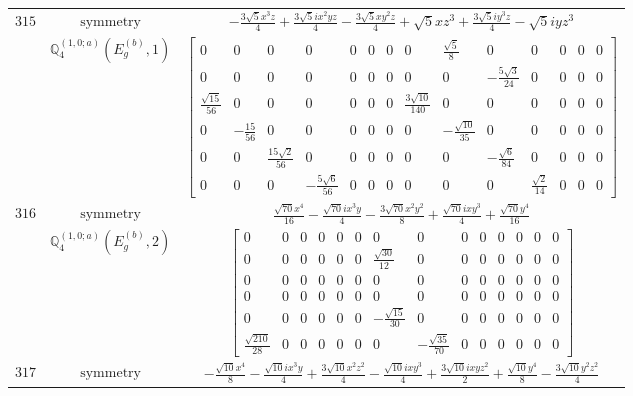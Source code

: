 \documentclass[fleqn,8pt,landscape]{jsarticle}
\begin{document}
\begin{longtable}{ccc}
$ 315 $ & $ \text{symmetry} $ & $ - \frac{3 \sqrt{5} x^{3} z}{4} + \frac{3 \sqrt{5} i x^{2} y z}{4} - \frac{3 \sqrt{5} x y^{2} z}{4} + \sqrt{5} x z^{3} + \frac{3 \sqrt{5} i y^{3} z}{4} - \sqrt{5} i y z^{3} $ \\
$  $ & $ \mathbb{Q}_{4}^{(1,0;a)}(E_{g}^{(b)},1) $ & $ \begin{bmatrix} 0 & 0 & 0 & 0 & 0 & 0 & 0 & 0 & \frac{\sqrt{5}}{8} & 0 & 0 & 0 & 0 & 0 \\ 0 & 0 & 0 & 0 & 0 & 0 & 0 & 0 & 0 & - \frac{5 \sqrt{3}}{24} & 0 & 0 & 0 & 0 \\ \frac{\sqrt{15}}{56} & 0 & 0 & 0 & 0 & 0 & 0 & \frac{3 \sqrt{10}}{140} & 0 & 0 & 0 & 0 & 0 & 0 \\ 0 & - \frac{15}{56} & 0 & 0 & 0 & 0 & 0 & 0 & - \frac{\sqrt{10}}{35} & 0 & 0 & 0 & 0 & 0 \\ 0 & 0 & \frac{15 \sqrt{2}}{56} & 0 & 0 & 0 & 0 & 0 & 0 & - \frac{\sqrt{6}}{84} & 0 & 0 & 0 & 0 \\ 0 & 0 & 0 & - \frac{5 \sqrt{6}}{56} & 0 & 0 & 0 & 0 & 0 & 0 & \frac{\sqrt{2}}{14} & 0 & 0 & 0 \end{bmatrix} $ \\ \hline
$ 316 $ & $ \text{symmetry} $ & $ \frac{\sqrt{70} x^{4}}{16} - \frac{\sqrt{70} i x^{3} y}{4} - \frac{3 \sqrt{70} x^{2} y^{2}}{8} + \frac{\sqrt{70} i x y^{3}}{4} + \frac{\sqrt{70} y^{4}}{16} $ \\
$  $ & $ \mathbb{Q}_{4}^{(1,0;a)}(E_{g}^{(b)},2) $ & $ \begin{bmatrix} 0 & 0 & 0 & 0 & 0 & 0 & 0 & 0 & 0 & 0 & 0 & 0 & 0 & 0 \\ 0 & 0 & 0 & 0 & 0 & 0 & \frac{\sqrt{30}}{12} & 0 & 0 & 0 & 0 & 0 & 0 & 0 \\ 0 & 0 & 0 & 0 & 0 & 0 & 0 & 0 & 0 & 0 & 0 & 0 & 0 & 0 \\ 0 & 0 & 0 & 0 & 0 & 0 & 0 & 0 & 0 & 0 & 0 & 0 & 0 & 0 \\ 0 & 0 & 0 & 0 & 0 & 0 & - \frac{\sqrt{15}}{30} & 0 & 0 & 0 & 0 & 0 & 0 & 0 \\ \frac{\sqrt{210}}{28} & 0 & 0 & 0 & 0 & 0 & 0 & - \frac{\sqrt{35}}{70} & 0 & 0 & 0 & 0 & 0 & 0 \end{bmatrix} $ \\ \hline
$ 317 $ & $ \text{symmetry} $ & $ - \frac{\sqrt{10} x^{4}}{8} - \frac{\sqrt{10} i x^{3} y}{4} + \frac{3 \sqrt{10} x^{2} z^{2}}{4} - \frac{\sqrt{10} i x y^{3}}{4} + \frac{3 \sqrt{10} i x y z^{2}}{2} + \frac{\sqrt{10} y^{4}}{8} - \frac{3 \sqrt{10} y^{2} z^{2}}{4} $ \\

\end{longtable}
\end{document}
